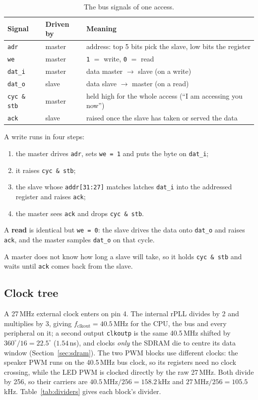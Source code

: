 \documentclass[a4paper,10pt]{article}
\begin{document}
\begin{table}[H]
\centering
\caption{The bus signals of one access.}
\label{tab:wb}
\small
\begin{tabular}{lll}
\toprule
\textbf{Signal} & \textbf{Driven by} & \textbf{Meaning} \\
\midrule
\texttt{adr} & master & address: top 5 bits pick the slave, low bits the register \\
\texttt{we} & master & \texttt{1} $=$ write, \texttt{0} $=$ read \\
\texttt{dat\_i} & master & data master $\to$ slave (on a write) \\
\texttt{dat\_o} & slave & data slave $\to$ master (on a read) \\
\texttt{cyc\,\&\,stb} & master & held high for the whole access (``I am accessing you now'') \\
\texttt{ack} & slave & raised once the slave has taken or served the data \\
\bottomrule
\end{tabular}
\end{table}

A write runs in four steps:
\begin{enumerate}\setlength{\itemsep}{0pt}
\item the master drives \texttt{adr}, sets \texttt{we\,=\,1} and puts the byte on \texttt{dat\_i};
\item it raises \texttt{cyc\,\&\,stb};
\item the slave whose \texttt{addr[31:27]} matches latches \texttt{dat\_i} into the addressed register and raises \texttt{ack};
\item the master sees \texttt{ack} and drops \texttt{cyc\,\&\,stb}.
\end{enumerate}

A \textbf{read} is identical but
\texttt{we\,=\,0}: the slave drives the data onto \texttt{dat\_o} and raises
\texttt{ack}, and the master samples \texttt{dat\_o} on that cycle.

A master does not know how long a slave will take, so it holds \texttt{cyc\,\&\,stb}
and waits until \texttt{ack} comes back from the slave.


\subsection{Clock tree}
\label{sec:clocks}

A 27\,MHz external clock enters on pin 4. The internal rPLL divides by 2 and multiplies by 3,
giving $f_\mathrm{clkout}=40.5$\,MHz for the CPU, the bus and every peripheral on it;
a second output \texttt{clkoutp} is the same 40.5\,MHz shifted by
$360^{\circ}/16=22.5^{\circ}$ ($1.54$\,ns), and clocks \emph{only} the SDRAM die to
centre its data window (Section~\ref{sec:sdram}). The two PWM blocks use different clocks:
the speaker PWM runs on the 40.5\,MHz bus clock, so its registers need no clock crossing,
while the LED PWM is clocked directly by the raw 27\,MHz. Both divide by 256, so their
carriers are $40.5\,\mathrm{MHz}/256 = 158.2$\,kHz and $27\,\mathrm{MHz}/256 = 105.5$\,kHz.
Table~\ref{tab:dividers} gives each block's divider.
\end{document}
